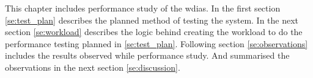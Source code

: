 
This chapter includes performance study of the \acrshort{wdias}. In the first section \ref{se:test_plan} describes the planned method of testing the system.
In the next section \ref{se:workload} describes the logic behind creating the workload to do the performance testing planned in \ref{se:test_plan}.
Following section \ref{se:observations} includes the results observed while performance study. And summarised the observations in the next section \ref{se:discussion}.

